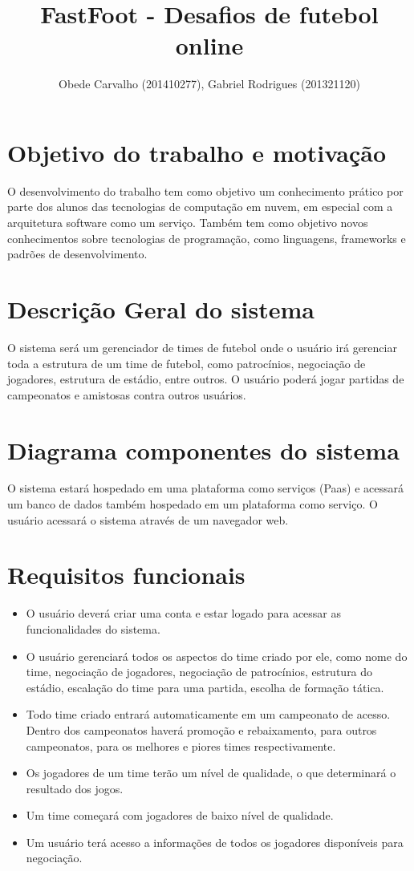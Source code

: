 \documentclass[11pt,a4paper]{article}
\title{FastFoot - Desafios de futebol online}
\author{Obede Carvalho (201410277), Gabriel Rodrigues (201321120)}
\date{}
\begin{document}
	\maketitle
	
	\section*{Objetivo do trabalho e motivação}
		O desenvolvimento do trabalho tem como objetivo um conhecimento prático por parte dos alunos das tecnologias de computação em nuvem, em especial com a arquitetura software como um serviço. Também tem como objetivo novos conhecimentos sobre tecnologias de programação, como linguagens, frameworks e padrões de desenvolvimento.

	\section*{Descrição Geral do sistema}
		O sistema será um gerenciador de times de futebol onde o usuário irá gerenciar toda a estrutura de um time de futebol, como patrocínios, negociação de jogadores, estrutura de estádio, entre outros. O usuário poderá jogar partidas de campeonatos e amistosas contra outros usuários.

	\section*{Diagrama componentes do sistema}
		O sistema estará hospedado em uma plataforma como serviços (Paas) e acessará um banco de dados também hospedado em um plataforma como serviço. O usuário acessará o sistema através de um navegador web.

	\section*{Requisitos funcionais}
		\begin{itemize}
			\item O usuário deverá criar uma conta e estar logado para acessar as funcionalidades do sistema.
			\item O usuário gerenciará todos os aspectos do time criado por ele, como nome do time, negociação de jogadores, negociação de patrocínios, estrutura do estádio, escalação do time para uma partida, escolha de formação tática.
			\item Todo time criado entrará automaticamente em um campeonato de acesso. Dentro dos campeonatos haverá promoção e rebaixamento, para outros campeonatos, para os melhores e piores times respectivamente.
			\item Os jogadores de um time terão um nível de qualidade, o que determinará o resultado dos jogos.
			\item Um time começará com jogadores de baixo nível de qualidade.
			\item Um usuário terá acesso a informações de todos os jogadores disponíveis para negociação.	
		\end{itemize}
\end{document}
